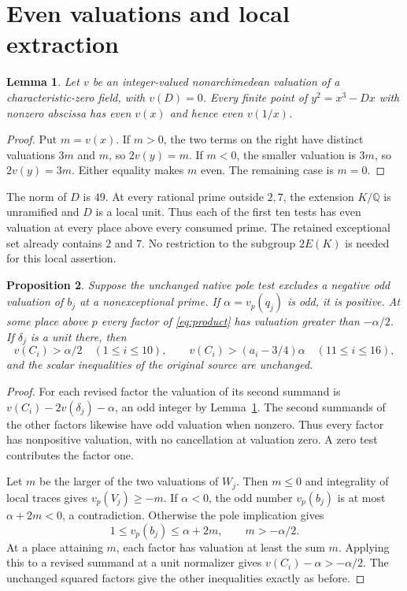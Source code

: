 \documentclass[11pt,a4paper]{article}
\newcommand{\Q}{\mathbb Q}\newcommand{\Z}{\mathbb Z}
\newtheorem{lemma}{Lemma}
\newtheorem{proposition}[lemma]{Proposition}
\begin{document}
\section{Even valuations and local extraction}

\begin{lemma}\label{lem:even}
Let $v$ be an integer-valued nonarchimedean valuation of a
characteristic-zero field, with $v(D)=0$. Every finite point of
$y^2=x^3-Dx$ with nonzero abscissa has even $v(x)$ and hence
even $v(1/x)$.
\end{lemma}
\begin{proof}
Put $m=v(x)$. If $m>0$, the two terms on the right have distinct
valuations $3m$ and $m$, so $2v(y)=m$. If $m<0$, the smaller
valuation is $3m$, so $2v(y)=3m$. Either equality makes $m$
even. The remaining case is $m=0$.
\end{proof}

The norm of $D$ is $49$. At every rational prime outside $2,7$,
the extension $K/\Q$ is unramified and $D$ is a local unit.
Thus each of the first ten tests has even valuation at every place
above every consumed prime. The retained exceptional set already
contains $2$ and $7$. No restriction to the subgroup $2E(K)$ is
needed for this local assertion.

\begin{proposition}\label{prop:local}
Suppose the unchanged native pole test excludes a negative odd
valuation of $b_j$ at a nonexceptional prime. If
$\alpha=v_p(q_j)$ is odd, it is positive. At some place above $p$
every factor of \eqref{eq:product} has valuation greater than
$-\alpha/2$. If $\delta_j$ is a unit there, then
\[
 v(C_i)>\alpha/2\quad(1\le i\le10),\qquad
 v(C_i)>(a_i-3/4)\alpha\quad(11\le i\le16),
\]
and the scalar inequalities of the original source are unchanged.
\end{proposition}
\begin{proof}
For each revised factor the valuation of its second summand is
$v(C_i)-2v(\delta_j)-\alpha$, an odd integer by
Lemma~\ref{lem:even}. The second summands of the other factors
likewise have odd valuation when nonzero. Thus every factor has
nonpositive valuation, with no cancellation at valuation zero.
A zero test contributes the factor one.

Let $m$ be the larger of the two valuations of $W_j$. Then
$m\le0$ and integrality of local traces gives $v_p(V_j)\ge-m$.
If $\alpha<0$, the odd number $v_p(b_j)$ is at most
$\alpha+2m<0$, a contradiction. Otherwise the pole implication
gives
\[
             1\le v_p(b_j)\le\alpha+2m,
             \qquad m>-\alpha/2.
\]
At a place attaining $m$, each factor has valuation at least the
sum $m$. Applying this to a revised summand at a unit normalizer
gives $v(C_i)-\alpha>-\alpha/2$. The unchanged squared factors
give the other inequalities exactly as before.
\end{proof}
\end{document}
